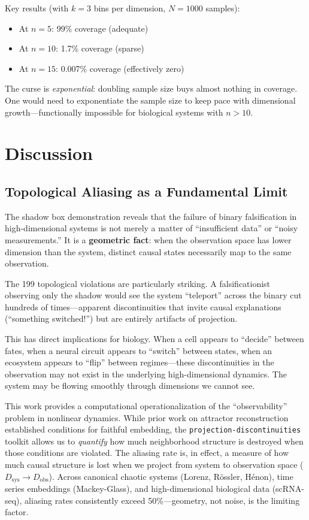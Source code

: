 \documentclass[12pt]{article}
\begin{document}
Key results (with $k = 3$ bins per dimension, $N = 1000$ samples):
\begin{itemize}
    \item At $n = 5$: 99\% coverage (adequate)
    \item At $n = 10$: 1.7\% coverage (sparse)
    \item At $n = 15$: 0.007\% coverage (effectively zero)
\end{itemize}

The curse is \emph{exponential}: doubling sample size buys almost nothing in coverage. One would need to exponentiate the sample size to keep pace with dimensional growth---functionally impossible for biological systems with $n > 10$.

\section{Discussion}

\subsection{Topological Aliasing as a Fundamental Limit}

The shadow box demonstration reveals that the failure of binary falsification in high-dimensional systems is not merely a matter of ``insufficient data'' or ``noisy measurements.'' It is a \textbf{geometric fact}: when the observation space has lower dimension than the system, distinct causal states necessarily map to the same observation.

The 199 topological violations are particularly striking. A falsificationist observing only the shadow would see the system ``teleport'' across the binary cut hundreds of times---apparent discontinuities that invite causal explanations (``something switched!'') but are entirely artifacts of projection.

This has direct implications for biology. When a cell appears to ``decide'' between fates, when a neural circuit appears to ``switch'' between states, when an ecosystem appears to ``flip'' between regimes---these discontinuities in the observation may not exist in the underlying high-dimensional dynamics. The system may be flowing smoothly through dimensions we cannot see.

This work provides a computational operationalization of the ``observability'' problem in nonlinear dynamics. While prior work on attractor reconstruction \cite{takens1981} established conditions for faithful embedding, the \texttt{projection-discontinuities} toolkit allows us to \textit{quantify} how much neighborhood structure is destroyed when those conditions are violated. The aliasing rate is, in effect, a measure of how much causal structure is lost when we project from system to observation space ($D_{\text{sys}} \to D_{\text{obs}}$). Across canonical chaotic systems (Lorenz, Rössler, Hénon), time series embeddings (Mackey-Glass), and high-dimensional biological data (scRNA-seq), aliasing rates consistently exceed 50\%---geometry, not noise, is the limiting factor.
\end{document}
